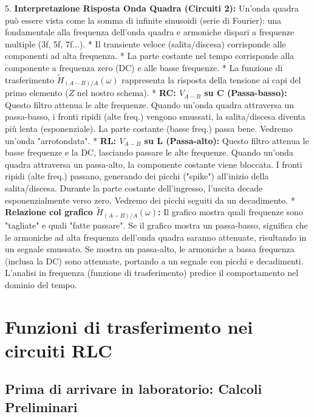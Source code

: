 \documentclass[a4paper, 11pt]{article}
\begin{document}
5.  \textbf{Interpretazione Risposta Onda Quadra (Circuiti 2):} Un'onda quadra può essere vista come la somma di infinite sinusoidi (serie di Fourier): una fondamentale alla frequenza dell'onda quadra e armoniche dispari a frequenze multiple (3f, 5f, 7f...).
    *   Il transiente veloce (salita/discesa) corrisponde alle componenti ad alta frequenza.
    *   La parte costante nel tempo corrisponde alla componente a frequenza zero (DC) e alle basse frequenze.
    *   La funzione di trasferimento $\tilde{H}_{(A-B)/A}(\omega)$ rappresenta la risposta della tensione ai capi del primo elemento ($Z$ nel nostro schema).
        *   \textbf{RC: $V_{A-B}$ su C (Passa-basso):} Questo filtro attenua le alte frequenze. Quando un'onda quadra attraversa un passa-basso, i fronti ripidi (alte freq.) vengono smussati, la salita/discesa diventa più lenta (esponenziale). La parte costante (basse freq.) passa bene. Vedremo un'onda "arrotondata".
        *   \textbf{RL: $V_{A-B}$ su L (Passa-alto):} Questo filtro attenua le basse frequenze e la DC, lasciando passare le alte frequenze. Quando un'onda quadra attraversa un passa-alto, la componente costante viene bloccata. I fronti ripidi (alte freq.) passano, generando dei picchi ("spike") all'inizio della salita/discesa. Durante la parte costante dell'ingresso, l'uscita decade esponenzialmente verso zero. Vedremo dei picchi seguiti da un decadimento.
    *   \textbf{Relazione col grafico $\tilde{H}_{(A-B)/A}(\omega)$:} Il grafico mostra quali frequenze sono "tagliate" e quali "fatte passare". Se il grafico mostra un passa-basso, significa che le armoniche ad alta frequenza dell'onda quadra saranno attenuate, risultando in un segnale smussato. Se mostra un passa-alto, le armoniche a bassa frequenza (inclusa la DC) sono attenuate, portando a un segnale con picchi e decadimenti. L'analisi in frequenza (funzione di trasferimento) predice il comportamento nel dominio del tempo.

\newpage
\section{Funzioni di trasferimento nei circuiti RLC}

\subsection{Prima di arrivare in laboratorio: Calcoli Preliminari}
\end{document}
